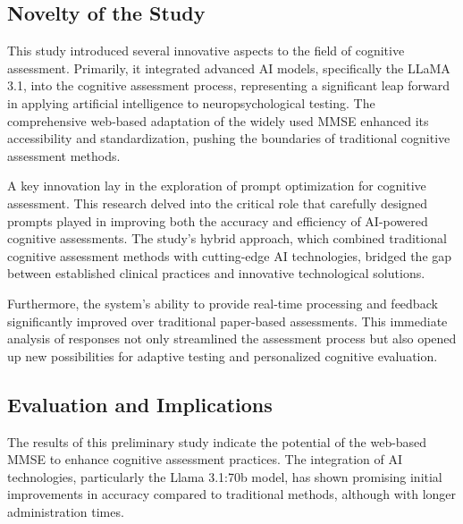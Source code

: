 \subsection{Novelty of the Study}

This study introduced several innovative aspects to the field of cognitive assessment. Primarily, it integrated advanced AI models, specifically the LLaMA 3.1, into the cognitive assessment process, representing a significant leap forward in applying artificial intelligence to neuropsychological testing. The comprehensive web-based adaptation of the widely used MMSE enhanced its accessibility and standardization, pushing the boundaries of traditional cognitive assessment methods.

A key innovation lay in the exploration of prompt optimization for cognitive assessment. This research delved into the critical role that carefully designed prompts played in improving both the accuracy and efficiency of AI-powered cognitive assessments. The study's hybrid approach, which combined traditional cognitive assessment methods with cutting-edge AI technologies, bridged the gap between established clinical practices and innovative technological solutions.

Furthermore, the system's ability to provide real-time processing and feedback significantly improved over traditional paper-based assessments. This immediate analysis of responses not only streamlined the assessment process but also opened up new possibilities for adaptive testing and personalized cognitive evaluation.

\subsection{Evaluation and Implications}

The results of this preliminary study indicate the potential of the web-based MMSE to enhance cognitive assessment practices. The integration of AI technologies, particularly the Llama 3.1:70b model, has shown promising initial improvements in accuracy compared to traditional methods, although with longer administration times.

